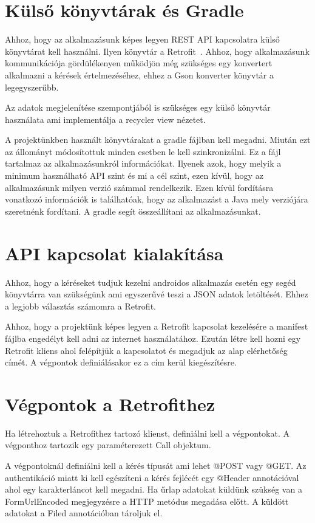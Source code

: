 \documentclass[
]{thesis-ekf}
\theoremstyle{definition}
\theoremstyle{remark}
\begin{document}
	\section{Külső könyvtárak és Gradle}
	Ahhoz, hogy az alkalmazásunk képes legyen REST API kapcsolatra külső könyvtárat kell használni. Ilyen könyvtár a Retrofit~\cite{retrofit_doc}. Ahhoz, hogy alkalmazásunk kommunikációja gördülékenyen működjön még szükséges egy konvertert alkalmazni a kérések értelmezéséhez, ehhez a Gson konverter könyvtár a legegyszerűbb. 
	
	Az adatok megjelenítése szempontjából is szükséges egy külső könyvtár használata ami implementálja a recycler view nézetet.
	
	A projektünkben használt könyvtárakat a gradle fájlban kell megadni. Miután ezt az állományt módosítottuk minden esetben le kell szinkronizálni. Ez a fájl tartalmaz az alkalmazásunkról információkat. Ilyenek azok, hogy melyik a minimum használható API szint és mi a cél szint, ezen kívül, hogy az alkalmazásunk milyen verzió számmal rendelkezik. Ezen kívül fordításra vonatkozó információk is találhatóak, hogy az alkalmazást a Java mely verziójára szeretnénk fordítani. A gradle segít összeállítani az alkalmazásunkat.
	
	\section{API kapcsolat kialakítása}
	Ahhoz, hogy a kéréseket tudjuk kezelni androidos alkalmazás esetén egy segéd könyvtárra van szükségünk ami egyszerűvé teszi a JSON adatok letöltését. Ehhez a legjobb választás számomra a Retrofit.
	
	Ahhoz, hogy a projektünk képes legyen a Retrofit kapcsolat kezelésére a manifest fájlba engedélyt kell adni az internet használatához. Ezután létre kell hozni egy Retrofit kliens ahol felépítjük a kapcsolatot és megadjuk az alap elérhetőség címét. A végpontok definiálásakor ez a cím kerül kiegészítésre. 
	
	\section{Végpontok a Retrofithez}
	Ha létrehoztuk a Retrofithez tartozó klienst, definiálni kell a végpontokat. A végponthoz tartozik egy paraméterezett Call objektum.
	
	A végpontoknál definiálni kell a kérés típusát ami lehet @POST vagy @GET. Az authentikáció miatt ki kell egészíteni a kérés fejlécét egy @Header annotációval ahol egy karakterláncot kell megadni. Ha űrlap adatokat küldünk szükség van a FormUrlEncoded megjegyzésre a HTTP metódus megadása előtt. A küldött adatokat a Filed annotációban tároljuk el.
	
\end{document}
